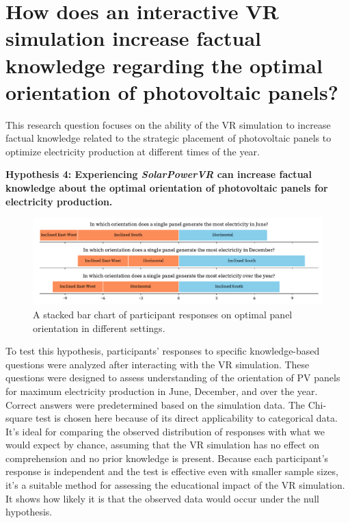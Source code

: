 \documentclass[draft, final]{vutinfth} %
\begin{document}
\section{How does an interactive VR simulation increase factual knowledge regarding the optimal orientation of photovoltaic panels?}

This research question focuses on the ability of the VR simulation to increase factual knowledge related to the strategic placement of photovoltaic panels to optimize electricity production at different times of the year.

\textbf{Hypothesis 4: Experiencing \textit{SolarPowerVR} can increase factual knowledge about the optimal orientation of photovoltaic panels for electricity production.} 

\begin{figure}[h]
    \centering
    \includegraphics[width=\textwidth]{graphics/research-3.pdf}
    \caption{A stacked bar chart of participant responses on optimal panel orientation in different settings.}
    \label{fig:research-3}
\end{figure}

To test this hypothesis, participants' responses to specific knowledge-based questions were analyzed after interacting with the VR simulation. These questions were designed to assess understanding of the orientation of PV panels for maximum electricity production in June, December, and over the year. Correct answers were predetermined based on the simulation data.
The Chi-square test is chosen here because of its direct applicability to categorical data. It's ideal for comparing the observed distribution of responses with what we would expect by chance, assuming that the VR simulation has no effect on comprehension and no prior knowledge is present. Because each participant's response is independent and the test is effective even with smaller sample sizes, it's a  suitable method for assessing the educational impact of the VR simulation. It shows how likely it is that the observed data would occur under the null hypothesis.
\end{document}
